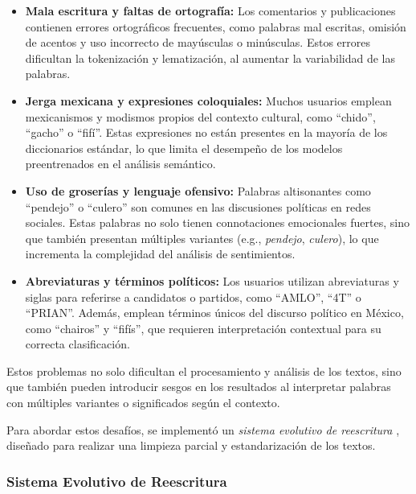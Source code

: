 \documentclass[10pt, a4paper]{article}
\begin{document}
	\begin{itemize}
		\item \textbf{Mala escritura y faltas de ortografía:} Los comentarios y publicaciones contienen errores ortográficos frecuentes, como palabras mal escritas, omisión de acentos y uso incorrecto de mayúsculas o minúsculas. Estos errores dificultan la tokenización y lematización, al aumentar la variabilidad de las palabras.
		
		\item \textbf{Jerga mexicana y expresiones coloquiales:} Muchos usuarios emplean mexicanismos y modismos propios del contexto cultural, como “chido”, “gacho” o “fifí”. Estas expresiones no están presentes en la mayoría de los diccionarios estándar, lo que limita el desempeño de los modelos preentrenados en el análisis semántico.
		
		\item \textbf{Uso de groserías y lenguaje ofensivo:} Palabras altisonantes como “pendejo” o “culero” son comunes en las discusiones políticas en redes sociales. Estas palabras no solo tienen connotaciones emocionales fuertes, sino que también presentan múltiples variantes (e.g., \textit{pendejo}, \textit{culero}), lo que incrementa la complejidad del análisis de sentimientos.
		
		\item \textbf{Abreviaturas y términos políticos:} Los usuarios utilizan abreviaturas y siglas para referirse a candidatos o partidos, como “AMLO”, “4T” o “PRIAN”. Además, emplean términos únicos del discurso político en México, como “chairos” y “fifís”, que requieren interpretación contextual para su correcta clasificación.
		
	\end{itemize}
	
	Estos problemas no solo dificultan el procesamiento y análisis de los textos, sino que también pueden introducir sesgos en los resultados al interpretar palabras con múltiples variantes o significados según el contexto.
	
	Para abordar estos desafíos, se implementó un \textit{sistema evolutivo de reescritura} \parencite{galindo1991sistemas}, diseñado para realizar una limpieza parcial y estandarización de los textos. 
	
	\subsubsection{Sistema Evolutivo de Reescritura}
	
\end{document}
